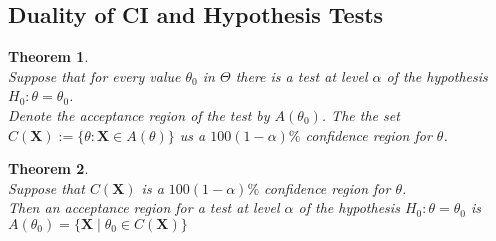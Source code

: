 \documentclass[12pt]{article}
\newtheorem{theorem}{Theorem}[section]
\theoremstyle{definition}
\begin{document}
\subsection{Duality of CI and Hypothesis Tests}
\begin{theorem}
\hfill\\\normalfont Suppose that for every value $\theta_0$ in $\Theta$ there is a test at level $\alpha$ of the hypothesis $H_0:\theta=\theta_0$. \\
Denote the acceptance region of the test by $A(\theta_0)$. The the set
$
C(\bm{X}):=\{\theta:\bm{X}\in A(\theta)\}
$
us a $100(1-\alpha)\%$ confidence region for $\theta$.
\end{theorem}
\begin{theorem}
\hfill\\\normalfont Suppose that $C(\bm{X})$ is a $100(1-\alpha)\%$ confidence region for $\theta$.\\
Then an acceptance region for a test at level $\alpha$ of the hypothesis $H_0:\theta=\theta_0$ is
$
A(\theta_0)=\{\bm{X}\mid \theta_0\in C(\bm{X})\}
$
\end{theorem}
\end{document}
